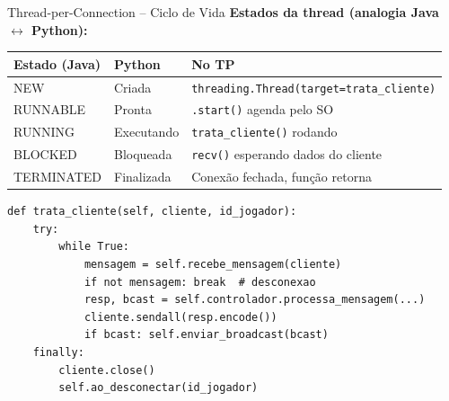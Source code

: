 \documentclass[aspectratio=169]{beamer}
\begin{document}
\begin{frame}[fragile, shrink=8]{Thread-per-Connection -- Ciclo de Vida}
  \textbf{Estados da thread (analogia Java $\leftrightarrow$ Python):}
  \footnotesize
  \begin{tabular}{>{\raggedright\arraybackslash}p{2.5cm}>{\raggedright\arraybackslash}p{3cm}>{\raggedright\arraybackslash}p{6cm}}
    \toprule
    \textbf{Estado (Java)} & \textbf{Python} & \textbf{No TP} \\
    \midrule
    NEW & Criada & \texttt{threading.Thread(target=trata\_cliente)} \\
    RUNNABLE & Pronta & \texttt{.start()} agenda pelo SO \\
    RUNNING & Executando & \texttt{trata\_cliente()} rodando \\
    BLOCKED & Bloqueada & \texttt{recv()} esperando dados do cliente \\
    TERMINATED & Finalizada & Conex\~ao fechada, fun\c{c}\~ao retorna \\
    \bottomrule
  \end{tabular}
  \vfill
  \begin{lstlisting}[style=pycode, basicstyle=\ttfamily\footnotesize]
def trata_cliente(self, cliente, id_jogador):
    try:
        while True:
            mensagem = self.recebe_mensagem(cliente)
            if not mensagem: break  # desconexao
            resp, bcast = self.controlador.processa_mensagem(...)
            cliente.sendall(resp.encode())
            if bcast: self.enviar_broadcast(bcast)
    finally:
        cliente.close()
        self.ao_desconectar(id_jogador)
\end{lstlisting}
\end{frame}
\end{document}
